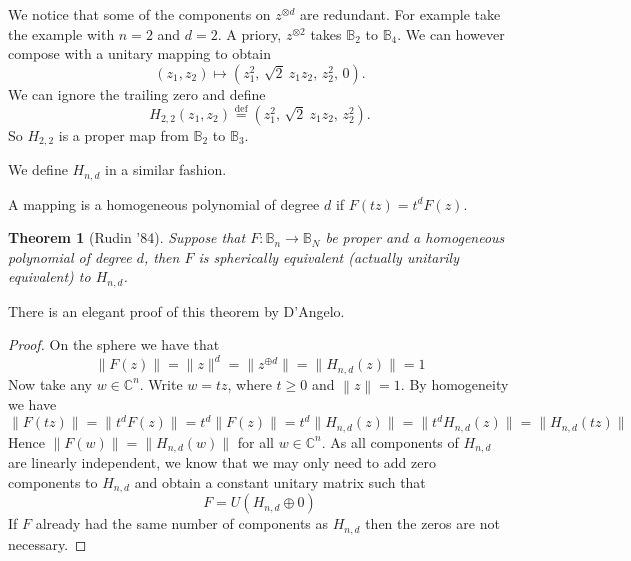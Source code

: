 \documentclass[12pt,openany]{book}
\newcommand{\norm}[1]{\left\lVert {#1} \right\rVert}
\newcommand{\smnorm}[1]{\lVert {#1} \rVert}
\newcommand{\C}{{\mathbb{C}}}
\newcommand{\bB}{{\mathbb{B}}}
\theoremstyle{plain}
\newtheorem{thm}{Theorem}[section]
\theoremstyle{remark}
\theoremstyle{definition}
\theoremstyle{exercise}
\theoremstyle{example}
\begin{document}
We notice that some of the components on $z^{\otimes d}$ are redundant.
For example take the example with $n=2$ and $d=2$.  A priory,
$z^{\otimes 2}$ takes $\bB_2$ to $\bB_4$.  We can however compose with 
a unitary mapping to obtain
\begin{equation}
(z_1,z_2) \mapsto
(z_1^2, \, \sqrt{2}~z_1z_2 , \, z_2^2, \, 0) .
\end{equation}
We can ignore the trailing zero and define
\begin{equation}
H_{2,2} (z_1,z_2) \overset{\mathrm{def}}{=} (z_1^2, \, \sqrt{2}~z_1z_2, \, z_2^2) .
\end{equation}
So $H_{2,2}$ is a proper map from $\bB_2$ to $\bB_3$.

We define $H_{n,d}$ in a similar fashion.

A mapping is a homogeneous polynomial of degree $d$ if $F(tz) = t^d F(z)$.

\begin{thm}[Rudin '84]
Suppose that $F \colon \bB_n \to \bB_N$ be
proper and a homogeneous polynomial of degree $d$, then $F$ is spherically
equivalent (actually unitarily equivalent) to $H_{n,d}$.
\end{thm}


There is an elegant proof of this theorem by D'Angelo.

\begin{proof}
On the sphere we have that
\begin{equation}
\smnorm{F(z)} = \smnorm{z}^d = \smnorm{z^{\oplus d}} = \smnorm{H_{n,d}(z)} = 1
\end{equation}
Now take any $w \in \C^n$.  Write $w = t z$, where $t \geq 0$ and
$\norm{z} = 1$.  By homogeneity we have
\begin{equation}
\smnorm{F(tz)} =
\smnorm{t^d F(z)} =
t^d \smnorm{F(z)}
= t^d \smnorm{H_{n,d}(z)}
= \smnorm{t^d H_{n,d}(z)}
= \smnorm{H_{n,d}(tz)}
\end{equation}
Hence $\smnorm{F(w)} = \smnorm{H_{n,d}(w)}$ for all $w \in \C^n$.  As all
components of $H_{n,d}$ are linearly independent, we know that we may only
need to add zero components to $H_{n,d}$ and obtain a constant unitary matrix such that
\begin{equation}
F = U ( H_{n,d} \oplus 0 )
\end{equation}
If $F$ already had the same number of components as $H_{n,d}$ then the zeros
are not necessary.
\end{proof}
\end{document}
